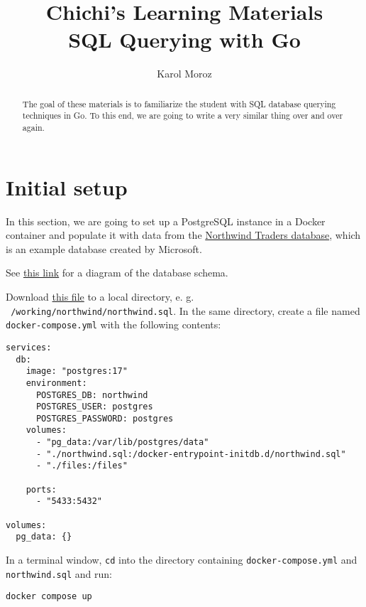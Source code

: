 \documentclass[a4paper,12pt]{article}
\title{Chichi's Learning Materials\\ SQL Querying with Go}
\author{Karol Moroz}
\begin{document}
\maketitle

\begin{abstract}
The goal of these materials is to familiarize the student with SQL database querying techniques in Go.
To this end, we are going to write a very similar thing over and over again.
\end{abstract}

\setlength{\parskip}{.5em}

\raggedright

\section{Initial setup}

In this section, we are going to set up a PostgreSQL instance in a Docker container and populate it with data from the \href{https://en.wikiversity.org/wiki/Database_Examples/Northwind}{Northwind Traders database}, which is an example database created by Microsoft.

See \href{https://github.com/pthom/northwind_psql/blob/master/ER.png}{this link} for a diagram of the database schema.

Download \href{https://raw.githubusercontent.com/pthom/northwind_psql/refs/heads/master/northwind.sql}{this file} to a local directory, e. g. \texttt{~/working/northwind/northwind.sql}.
In the same directory, create a file named \texttt{docker-compose.yml} with the following contents:

\begin{verbatim}
services:
  db:
    image: "postgres:17"
    environment:
      POSTGRES_DB: northwind
      POSTGRES_USER: postgres
      POSTGRES_PASSWORD: postgres
    volumes:
      - "pg_data:/var/lib/postgres/data"
      - "./northwind.sql:/docker-entrypoint-initdb.d/northwind.sql"
      - "./files:/files"

    ports:
      - "5433:5432"

volumes:
  pg_data: {}
\end{verbatim}

In a terminal window, \texttt{cd} into the directory containing \texttt{docker-compose.yml} and \texttt{northwind.sql} and run:

\begin{verbatim}
docker compose up
\end{verbatim}
\end{document}
